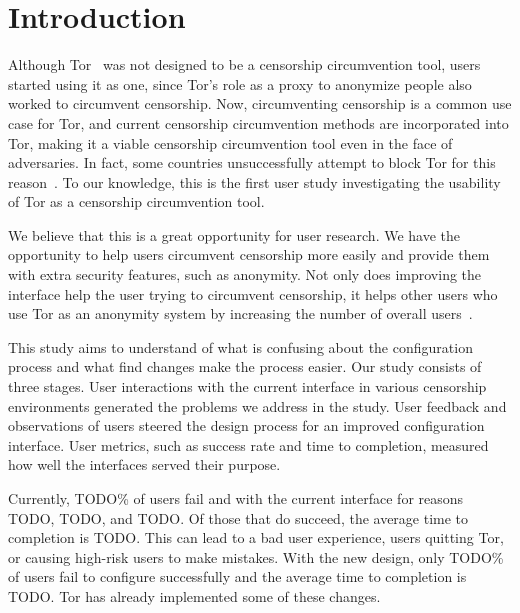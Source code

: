 \documentclass[USenglish,oneside,twocolumn]{article}
\begin{document}


\maketitle

\section{Introduction}

Although Tor~\cite{dingledine2004tor} was not designed to be a censorship circumvention tool, users started
using it as one, since Tor's role as a proxy to anonymize
people also worked to circumvent censorship. Now, circumventing censorship is a
common use case for Tor, and current censorship circumvention methods are
incorporated into Tor, making it a viable censorship circumvention tool even in the face
of adversaries. In fact, some countries unsuccessfully attempt to block Tor for this reason~\cite{winter2012great}. 
To our knowledge, this is the first user study investigating the usability of Tor as a 
censorship circumvention tool.

We believe that this is a great opportunity for user research. We have the opportunity to help users circumvent censorship more easily and provide them with extra security features, such as anonymity. Not only does improving the interface help the user trying to circumvent censorship, it helps other users who use Tor as an anonymity system by increasing the number of overall users~\cite{dingledine2006anonymity}. 

This study aims to understand of what is confusing about the configuration process and what find changes make the process easier. Our study consists of three stages. User interactions with the current interface in various censorship environments generated the problems we address in the study. User feedback and observations of users steered the design process for an improved configuration interface. User metrics, such as success rate and time to completion, measured how well the interfaces served their purpose.  

Currently, {\color {red} TODO}\% of users fail and with the current interface for reasons {\color {red} TODO}, {\color {red} TODO}, and {\color {red} TODO}. Of those that do succeed, the average time to completion is {\color {red} TODO}. This can lead to a bad user experience, users quitting Tor, or causing high-risk users to make mistakes. With the new design, only {\color {red} TODO}\% of users fail to configure successfully and the average time to completion is {\color {red} TODO}. Tor has already implemented some of these changes.
\end{document}
